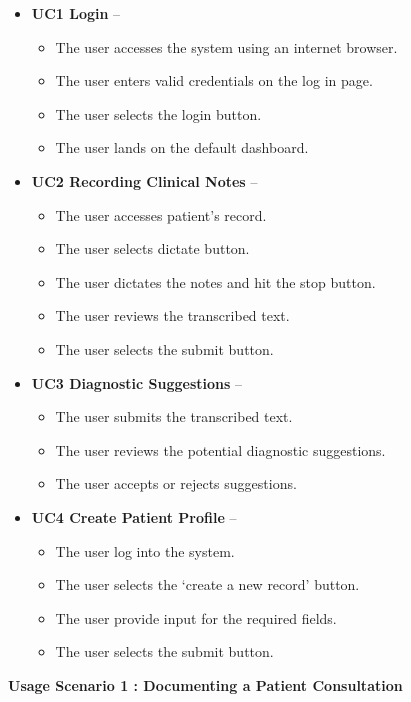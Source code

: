 \documentclass[12pt]{article}
\begin{document}
\begin{itemize}
  \item\textbf{UC1 Login} --
  \begin{itemize}
    \item The user accesses the system using an internet browser.
    \item The user enters valid credentials on the log in page.
    \item The user selects the login button.
    \item The user lands on the default dashboard.
  \end{itemize}
  \item\textbf{UC2 Recording Clinical Notes} --
  \begin{itemize}
    \item The user accesses patient’s record.
    \item The user selects dictate button.
    \item The user dictates the notes and hit the stop button.
    \item The user reviews the transcribed text.
    \item The user selects the submit button.
  \end{itemize}
  \item\textbf{UC3 Diagnostic Suggestions} --
  \begin{itemize}
    \item The user submits the transcribed text.
    \item The user reviews the potential diagnostic suggestions.
    \item The user accepts or rejects suggestions.
  \end{itemize}
  \item\textbf{UC4 Create Patient Profile} --
  \begin{itemize}
    \item The user log into the system.
    \item The user selects the ‘create a new record’ button.
    \item The user provide input for the required fields.    
    \item The user selects the submit button.
  \end{itemize}
\end{itemize}

\textbf{Usage Scenario 1 : Documenting a Patient Consultation}
\end{document}
